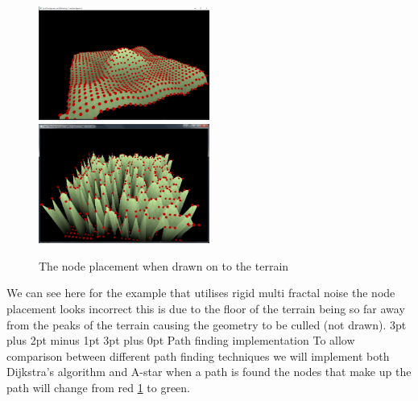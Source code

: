 \documentclass[12pt,a4paper]{article}
\makeatletter
\renewcommand\subsection{\@startsection {subsection}{1}{2mm} %
                               {3pt plus 2pt minus 1pt} %
                               {3pt plus 0pt} %
                               {\normalfont\bfseries}}
\makeatother
\begin{document}
\begin{figure}[ht!]
	\includegraphics[width=0.5\textwidth]{images/nodes}
	\includegraphics[width=0.5\textwidth]{images/RMFnodes}
	\caption{The node placement when drawn on to the terrain} \label{node}
\end{figure}

We can see here for the example that utilises rigid multi fractal noise the node placement looks incorrect this is due to the floor of the terrain being so far away from the peaks of the terrain causing the geometry to be culled (not drawn). 
\newpage
\subsection{Path finding implementation}
To allow comparison between different path finding techniques we will implement both Dijkstra's algorithm and A-star when a path is found the nodes that make up the path will change from red \ref{node} to green.  
\end{document}
